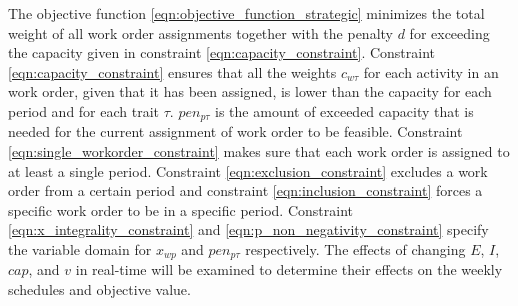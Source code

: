 The objective function \eqref{eqn:objective_function_strategic} minimizes the total weight of all work order assignments together with the penalty $d$ for exceeding the capacity given in constraint \eqref{eqn:capacity_constraint}. Constraint \eqref{eqn:capacity_constraint} ensures that all the weights $c_{w\tau}$ for each activity in an work order, given that it has been assigned, is lower than the capacity for each period and for each trait $\tau$. $pen_{p\tau}$ is the amount of exceeded capacity that is needed for the current assignment of work order to be feasible. Constraint \eqref{eqn:single_workorder_constraint} makes sure that each work order is assigned to at least a single period. Constraint \eqref{eqn:exclusion_constraint} excludes a work order from a certain period and constraint \eqref{eqn:inclusion_constraint} forces a specific work order to be in a specific period. Constraint \eqref{eqn:x_integrality_constraint} and \eqref{eqn:p_non_negativity_constraint} specify the variable domain for $x_{wp}$ and $pen_{p\tau}$ respectively. The effects of changing $E$, $I$, $cap$, and $v$ in real-time will be examined to determine their effects on the weekly schedules and objective value.
